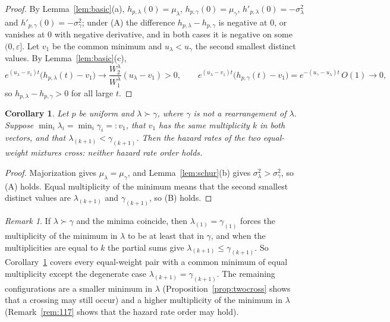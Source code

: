 \documentclass[10pt]{article}
\theoremstyle{plain}
\newtheorem{corollary}[theorem]{Corollary}
\theoremstyle{definition}
\theoremstyle{remark}
\newtheorem{remark}[theorem]{Remark}
\begin{document}
\begin{proof}
By Lemma~\ref{lem:basic}(a), $h_{p,\lambda}(0)=\mu_\lambda$, $h_{p,\gamma}(0)=\mu_\gamma$, $h'_{p,\lambda}(0)=-\sigma^2_\lambda$ and $h'_{p,\gamma}(0)=-\sigma^2_\gamma$; under (A) the difference $h_{p,\lambda}-h_{p,\gamma}$ is negative at $0$, or vanishes at $0$ with negative derivative, and in both cases it is negative on some $(0,\varepsilon]$. Let $v_1$ be the common minimum and $u_\lambda<u_\gamma$ the second smallest distinct values. By Lemma~\ref{lem:basic}(c),
\[
e^{(u_\lambda-v_1)t}\bigl(h_{p,\lambda}(t)-v_1\bigr)\to\frac{W_2^\lambda}{W_1^\lambda}(u_\lambda-v_1)>0,\qquad
e^{(u_\lambda-v_1)t}\bigl(h_{p,\gamma}(t)-v_1\bigr)=e^{-(u_\gamma-u_\lambda)t}\,O(1)\to 0,
\]
so $h_{p,\lambda}-h_{p,\gamma}>0$ for all large $t$.
\end{proof}

\begin{corollary}\label{cor:criterion}
Let $p$ be uniform and $\lambda\succ\gamma$, where $\gamma$ is not a rearrangement of $\lambda$. Suppose $\min_i\lambda_i=\min_i\gamma_i=:v_1$, that $v_1$ has the same multiplicity $k$ in both vectors, and that $\lambda_{(k+1)}<\gamma_{(k+1)}$. Then the hazard rates of the two equal-weight mixtures cross: neither hazard rate order holds.
\end{corollary}

\begin{proof}
Majorization gives $\mu_\lambda=\mu_\gamma$, and Lemma~\ref{lem:schur}(b) gives $\sigma^2_\lambda>\sigma^2_\gamma$, so (A) holds. Equal multiplicity of the minimum means that the second smallest distinct values are $\lambda_{(k+1)}$ and $\gamma_{(k+1)}$, so (B) holds.
\end{proof}

\begin{remark}\label{rem:criterion}
If $\lambda\succ\gamma$ and the minima coincide, then $\lambda_{(1)}=\gamma_{(1)}$ forces the multiplicity of the minimum in $\lambda$ to be at least that in $\gamma$, and when the multiplicities are equal to $k$ the partial sums give $\lambda_{(k+1)}\le\gamma_{(k+1)}$. So Corollary~\ref{cor:criterion} covers every equal-weight pair with a common minimum of equal multiplicity except the degenerate case $\lambda_{(k+1)}=\gamma_{(k+1)}$. The remaining configurations are a smaller minimum in $\lambda$ (Proposition~\ref{prop:twocross} shows that a crossing may still occur) and a higher multiplicity of the minimum in $\lambda$ (Remark~\ref{rem:117} shows that the hazard rate order may hold).
\end{remark}
\end{document}
